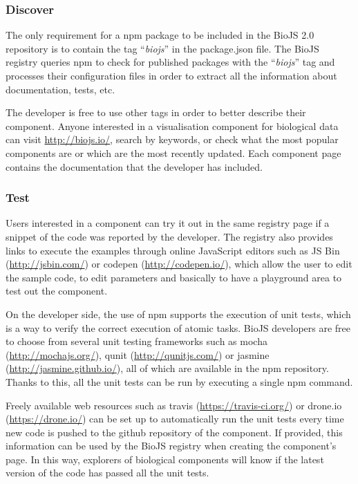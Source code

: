 \subsubsection{Discover}
The only requirement for a npm package to be included in the BioJS 2.0 repository is to contain the tag ``\emph{biojs}'' in the package.json file. The BioJS registry queries npm to check for published packages with the ``\emph{biojs}'' tag and processes their configuration files in order to extract all the information about documentation, tests, etc.

The developer is free to use other tags in order to better describe their component. Anyone interested in a visualisation component for biological data can visit \url{http://biojs.io/}, search by keywords, or check what the most popular components are or which are the most recently updated. Each component page contains the documentation that the developer has included.

\subsubsection{Test}
Users interested in a component can try it out in the same registry page if a snippet of the code was reported by the developer. The registry also provides links to execute the examples through online JavaScript editors such as JS Bin (\url{http://jsbin.com/}) or codepen (\url{http://codepen.io/}), which allow the user to edit the sample code, to edit parameters and basically to have a playground area to test out the component.

On the developer side, the use of npm supports the execution of unit tests, which is a way to verify the correct execution of atomic tasks. BioJS developers are free to choose from several unit testing frameworks such as mocha (\url{http://mochajs.org/}), qunit (\url{http://qunitjs.com/}) or jasmine (\url{http://jasmine.github.io/}), all of which are available in the npm repository. Thanks to this, all the unit tests can be run by executing a single npm command. 

Freely available web resources such as travis (\url{https://travis-ci.org/}) or drone.io (\url{https://drone.io/}) can be set up to automatically run the unit tests every time new code is pushed to the github repository of the component. If provided, this information can be used by the BioJS registry when creating the component's page. In this way, explorers of biological components will know if the latest version of the code has passed all the unit tests.

